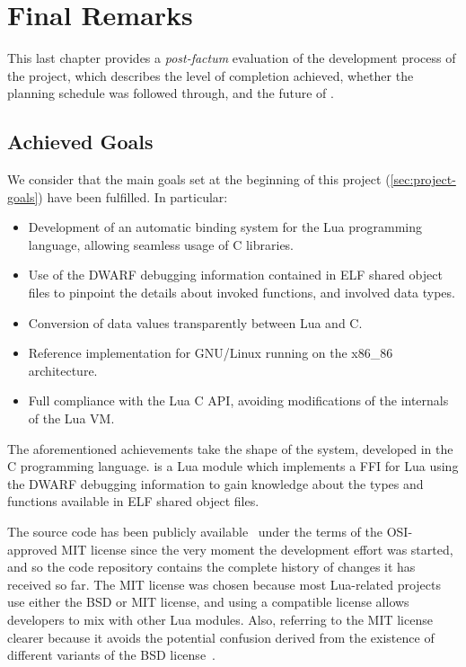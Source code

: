 \cleardoublepage
\setchaptertoc
\chapter{Final Remarks}

This last chapter provides a \emph{post-factum} evaluation of the development
process of the project, which describes the level of completion achieved,
whether the planning schedule was followed through, and the future of \Eol*.
\afterintro

\section{Achieved Goals}

We consider that the main goals set at the beginning of this project
(\autoref{sec:project-goals}) have been fulfilled. In particular:

\begin{itemize}

	\item Development of an automatic binding system for the Lua programming
	language, allowing seamless usage of C libraries.

	\item Use of the DWARF debugging information contained in ELF shared object
	files to pinpoint the details about invoked functions, and involved data
	types.

	\item Conversion of data values transparently between Lua and C.

	\item Reference implementation for GNU/Linux running on the
	x86\_86 architecture.

	\item Full compliance with the Lua C API, avoiding modifications of the
		internals of the Lua VM.

\end{itemize}

The aforementioned achievements take the shape of the \Eol* system, developed
in the C programming language. \Eol* is a Lua module which implements a FFI
for Lua using the DWARF debugging information to gain knowledge about the
types and functions available in ELF shared object files.

The source code has been publicly available~\cite{eol-github} under the terms
of the \gls{OSI}-approved MIT license since the very moment the development
effort was started, and so the code repository contains the complete history
of changes it has received so far. The MIT license was chosen because most
Lua-related projects use either the BSD or MIT license, and using a compatible
license allows developers to mix \Eol* with other Lua modules. Also, referring
to the MIT license clearer because it avoids the potential confusion derived
from the existence of different variants of the BSD
license~\cite{bsd-licenses}.

